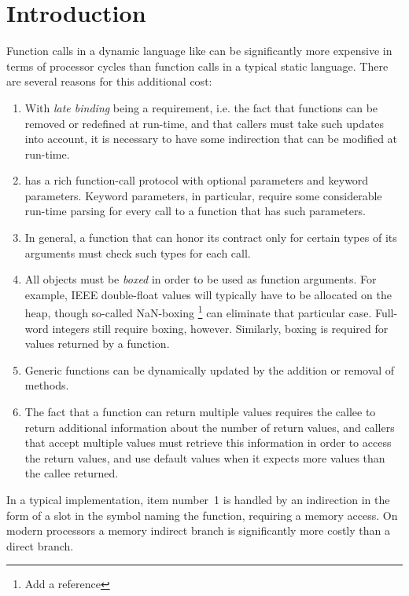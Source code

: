 \section{Introduction}
\label{sec-introduction}

Function calls in a dynamic language like \commonlisp{} can be
significantly more expensive in terms of processor cycles than
function calls in a typical static language.  There are several
reasons for this additional cost:

\begin{enumerate}
\item With \emph{late binding} being a requirement, i.e. the fact that
  functions can be removed or redefined at run-time, and that callers
  must take such updates into account, it is necessary to have some
  indirection that can be modified at run-time.
\item \commonlisp{} has a rich function-call protocol with optional
  parameters and keyword parameters.  Keyword parameters, in
  particular, require some considerable run-time parsing for every
  call to a function that has such parameters.
\item In general, a function that can honor its contract only for
  certain types of its arguments must check such types for each call.
\item All objects must be \emph{boxed} in order to be used as function
  arguments.  For example, IEEE double-float values will typically
  have to be allocated on the heap, though so-called NaN-boxing%
  \footnote{Add a reference} can eliminate that particular case.
  Full-word integers still require boxing, however.  Similarly, boxing
  is required for values returned by a function.
\item Generic functions can be dynamically updated by the addition or
  removal of methods.
\item The fact that a function can return multiple values requires the
  callee to return additional information about the number of
  return values, and callers that accept multiple values must retrieve
  this information in order to access the return values, and use
  default values when it expects more values than the callee
  returned.
\end{enumerate}

In a typical \commonlisp{} implementation, item number~1 is handled by
an indirection in the form of a slot in the symbol naming the
function, requiring a memory access.  On modern processors a memory
indirect branch is significantly more costly than a direct branch.

